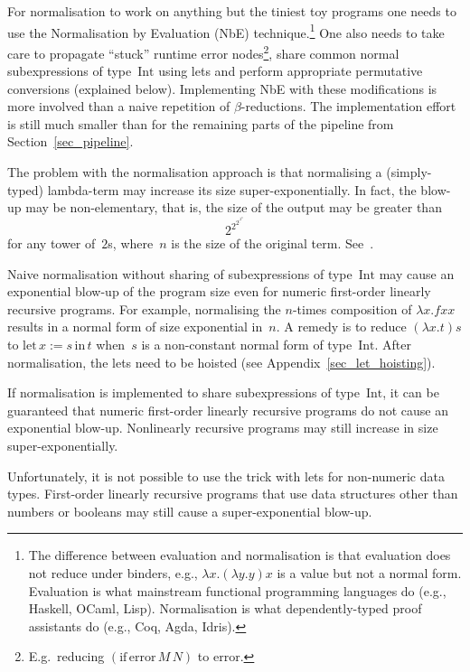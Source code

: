 \documentclass[final]{msc}
\begin{document}
For normalisation to work on anything but the tiniest toy programs one
needs to use the Normalisation by Evaluation (NbE)
technique.\footnote{The difference between evaluation and
normalisation is that evaluation does not reduce under binders, e.g.,
$\lambda x . (\lambda y . y) x$ is a value but not a normal
form. Evaluation is what mainstream functional programming languages
do (e.g., Haskell, OCaml, Lisp). Normalisation is what
dependently-typed proof assistants do (e.g., Coq, Agda, Idris).} One
also needs to take care to propagate ``stuck'' runtime error
nodes\footnote{E.g.~reducing $(\mathrm{if}\,\mathrm{error}\,M\,N)$ to
$\mathrm{error}$.}, share common normal subexpressions of
type~$\mathrm{Int}$ using lets and perform appropriate permutative conversions (explained below). Implementing NbE with these
modifications is more involved than a naive repetition of
$\beta$-reductions. The implementation effort
is still much smaller than for the remaining parts of the pipeline
from Section~\ref{sec_pipeline}.

The problem with the normalisation approach is that normalising a
(simply-typed) lambda-term may increase its size
super-exponentially. In fact, the blow-up may be non-elementary, that is,
the size of the output may be greater than
\[
2^{2^{2^{\vdots^{2^n}}}}
\]
for any tower of~$2$s, where~$n$ is the size of the original
term. See~\cite[Section~3.7]{lectures-curry-howard-isomorphism}.

Naive normalisation without sharing of subexpressions of type~$\mathrm{Int}$ may cause an exponential blow-up of the program size even for numeric first-order linearly recursive programs. For example, normalising the $n$-times composition of $\lambda x . f x x$ results in a normal form of size exponential in~$n$. A remedy is to reduce $(\lambda x . t) s$ to $\mathrm{let}\,x:=s\,\mathrm{in}\,t$ when~$s$ is a non-constant normal form of type~$\mathrm{Int}$. After normalisation, the lets need to be hoisted (see Appendix~\ref{sec_let_hoisting}).

If normalisation is implemented to share subexpressions of
type~$\mathrm{Int}$, it can be guaranteed that numeric first-order linearly recursive programs do not cause an exponential
blow-up. Nonlinearly recursive programs may still increase in size
super-exponentially.

Unfortunately, it is not possible to use the trick with lets for non-numeric data types. First-order linearly recursive
programs that use data structures other than numbers or booleans may still cause a super-exponential blow-up.
\end{document}
